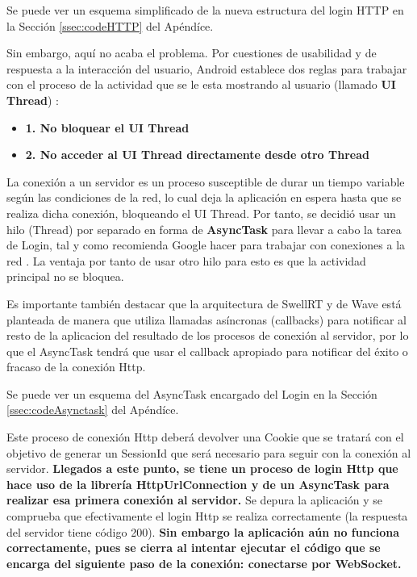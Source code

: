 	 Se puede ver un esquema simplificado de la nueva estructura del login HTTP en la Sección \ref{ssec:codeHTTP} del Apéndíce.
	  
	 Sin embargo, aquí no acaba el problema. Por cuestiones de usabilidad y de respuesta a la interacción del usuario, Android establece dos reglas para trabajar con el proceso de la actividad que se le esta mostrando al usuario (llamado \textbf{UI Thread}) \cite{ref:android_processes}:
	  
	  \begin{itemize}
	  	\item \textbf{1. No bloquear el UI Thread}
	  	\item \textbf{2. No acceder al UI Thread directamente desde otro Thread}
	  \end{itemize}
	  
	  La conexión a un servidor es un proceso susceptible de durar un tiempo variable según las condiciones de la red, lo cual deja la aplicación en espera hasta que se realiza dicha conexión,  bloqueando el UI Thread. Por tanto, se decidió usar un hilo (Thread) por separado en forma de \textbf{AsyncTask} \cite{ref:android_asynctask} para llevar a cabo la tarea de Login, tal y como recomienda Google hacer para trabajar con conexiones a la red \cite{ref:android_networking}. La ventaja por tanto de usar otro hilo para esto es que la actividad principal no se bloquea.
	  	 
	  Es importante también destacar que la arquitectura de SwellRT y de Wave está planteada de manera que utiliza llamadas asíncronas (callbacks) para notificar al resto de la aplicacion del resultado de los procesos de conexión al servidor, por lo que el AsyncTask tendrá que usar el callback apropiado para notificar del éxito o fracaso de la conexión Http.
	 
	  Se puede ver un esquema del AsyncTask encargado del Login en la Sección \ref{ssec:codeAsynctask} del Apéndíce.
	    
	  Este proceso de conexión Http deberá devolver una Cookie que se tratará con el objetivo de generar un SessionId que será necesario para seguir con la conexión al servidor. \textbf{Llegados a este punto, se tiene un proceso de login Http que hace uso de la librería HttpUrlConnection y de un AsyncTask para realizar esa primera conexión al servidor.} Se depura la aplicación y se comprueba que efectivamente el login Http se realiza correctamente (la respuesta del servidor tiene código 200). \textbf{Sin embargo la aplicación aún no funciona correctamente, pues se cierra al intentar ejecutar el código que se encarga del siguiente paso de la conexión: conectarse por WebSocket.}    
    
